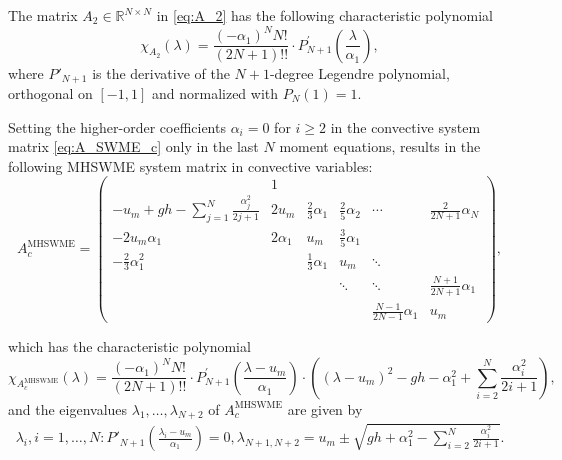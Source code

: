 \documentclass[10pt,a4paper]{amsart}
\begin{document}
\begin{lemma}\label{lemma:A_2_chi}
    The matrix $A_2 \in \mathbb{R}^{N \times N}$ in \eqref{eq:A_2} has the following characteristic polynomial
    \begin{equation}\label{eq:A_2_char_poly}
        \chi_{A_2}(\lambda) = \frac{(-\alpha_1)^NN!}{(2N+1)!!} \cdot P^{'}_{N+1}\left(\frac{\lambda}{\alpha_1}\right),
    \end{equation}
    where $P'_{N+1}$ is the derivative of the $N+1$-degree Legendre polynomial, orthogonal on $[-1,1]$ and normalized with $P_{N}(1)=1$.
\end{lemma}

\begin{theorem}\label{th:hybrid_convective_system}
    Setting the higher-order coefficients $\alpha_i=0$ for $i\geq 2$ in the convective system matrix \eqref{eq:A_SWME_c} only in the last $N$ moment equations, results in the following MHSWME system matrix in convective variables:
    \begin{equation}\label{eq:A_MHSWME_c}
        A^{\textrm{MHSWME}}_{c} =
        \left(\begin{array}{cccccc}
             & 1 &  &  &  &  \\
        - u_m + gh - \sum\limits_{j=1}^{N} \frac{\alpha_j^2}{2j+1} & 2 u_m & \frac{2}{3} \alpha_1 & \frac{2}{5} \alpha_2 &\cdots & \frac{2}{2 N+1} \alpha_N \\
            -2u_m \alpha_1 & 2\alpha_1 & u_m & \frac{3}{5} \alpha_1 & &\\
            -\frac{2}{3}\alpha_1^2 &   & \frac{1}{3}\alpha_1 & u_m & \ddots & \\
             &  &  & \ddots & \ddots & \frac{N+1}{2N+1}\alpha_1 \\
             &  &  &  & \frac{N-1}{2N-1}\alpha_1 & u_m
        \end{array}\right),
    \end{equation}

    which has the characteristic polynomial
    \begin{equation}\label{eq:A_MHSWME_char}
        \chi_{A^{\textrm{MHSWME}}_{c}}(\lambda) = \frac{(-\alpha_1)^NN!}{(2N+1)!!} \cdot P^{'}_{N+1}\left(\frac{\lambda-u_m}{\alpha_1}\right) \cdot \left( \left( \lambda - u_m \right)^2 - gh - \alpha_1^2 + \sum\limits_{i=2}^N\frac{\alpha_i^2}{2i+1}\right),
    \end{equation}
    and the eigenvalues $\lambda_1, \ldots, \lambda_{N+2}$ of $A^{\textrm{MHSWME}}_{c}$ are given by
    \begin{eqnarray}\label{eq:A_MHSWME_EV}
        \lambda_i, i=1,\ldots, N: P'_{N+1}\left(\frac{\lambda_i - u_m}{\alpha_1}\right)=0,
        \lambda_{N+1,N+2} = u_m \pm \sqrt{gh + \alpha_1^2 - \sum\limits_{i=2}^N\frac{\alpha_i^2}{2i+1}}.\\
    \end{eqnarray}
\end{theorem}
\end{document}

